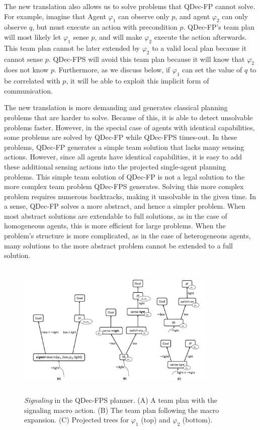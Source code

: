 \documentclass[letterpaper]{article}
\theoremstyle{definition}
\begin{document}
The new translation also allows us to solve problems that QDec-FP cannot solve. For
example, imagine
that Agent $\varphi_1$ can observe only $p$, and agent $\varphi_2$ can only observe $q$, but must execute an action with
precondition $p$. QDec-FP's team plan will most likely let $\varphi_1$ sense $p$, and
will make $\varphi_2$ execute the action afterwards.
This team plan cannot be later extended by $\varphi_2$ to a valid local plan because it cannot sense $p$. QDec-FPS will avoid this team plan because it will know that $\varphi_2$ does not know $p$. Furthermore, as we discuss below, if $\varphi_1$ can set the value of $q$ to be correlated with $p$, it will be able to exploit this implicit form of communication.

The new translation is more demanding and generates classical planning problems that are harder to solve.
Because of this, it is able to detect unsolvable problems faster.
However, in the special case of agents with identical capabilities,
some problems are solved
by QDec-FP while QDec-FPS times-out.
In these problems,  QDec-FP generates a simple team solution that lacks many sensing actions. However, since all agents have identical capabilities, it is easy to add these additional sensing actions
into the projected single-agent planning problems. This simple team solution of QDec-FP is not a legal solution to
the more complex team problem QDec-FPS generates. Solving this more complex problem requires numerous backtracks,
making it unsolvable in the given time.
In a sense, QDec-FP solves a more abstract,
and hence a simpler problem. When most abstract solutions are extendable to full solutions, as in the case of homogeneous agents, this is more efficient for large problems. When the problem's structure is more complicated, as in the case of heterogeneous agents, many solutions to the more abstract problem cannot be extended to a full solution.






\begin{figure}[h!]
\centering
\includegraphics[height=2.6in, width=0.85\textwidth]{signaling-r.pdf}
\caption{
\emph{Signaling} in the QDec-FPS planner.
(A) A team plan with the signaling macro action.
(B) The team plan following the macro expansion.
(C) Projected trees for $\varphi_1$ (top) and $\varphi_2$ (bottom).
}
\label{fig:signaling}
\end{figure}
\end{document}
